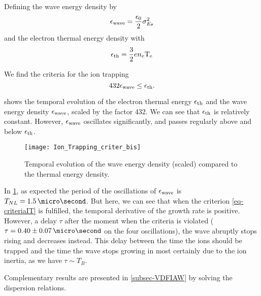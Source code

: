     Defining the wave energy  density by
    \begin{equation} \label{eq-waveE}
      \epsilon_{\rm wave} = \frac{\epsilon_0}{2} \sigma_{E_{\theta}}^2
    \end{equation}
    and the electron thermal energy density with
    \begin{equation} \label{eq-thE}
      \epsilon_{\rm th} = \frac{3}{2} e n_e \mathrm{T_e}
    \end{equation}
    
    We find the criteria for the ion trapping
    \begin{equation} \label{eq-criteriaIT}
      432 \epsilon_{\rm wave} \leq \epsilon_{\rm th}.
    \end{equation}
    
     shows the temporal evolution of the electron thermal energy $\epsilon_{\rm th}$ and the wave energy density $\epsilon_{\rm wave}$, scaled by the factor 432.
    We can see that $\epsilon_{\rm th}$ is relatively constant.
    However, $\epsilon_{\rm wave}$  oscillates significantly, and passes regularly above and below $\epsilon_{\rm th}$.
    
    \begin{figure}[hbt]
      \centering
      \texttt{[image: Ion\_Trapping\_criter\_bis]}
      \caption{Temporal evolution of the wave energy density (scaled) compared to the thermal energy density.}
      \label{fig-tempITcrit}
    \end{figure}
    
    In \cref{fig-tempITcrit}, as expected the period of the oscillations of $\epsilon_{\rm wave}$ is $T_{NL} = 1.5\,\micro\second$.
    But here, we can see that when the criterion \cref{eq-criteriaIT} is fulfilled, the temporal derivative of the growth rate is positive.
    However, a delay $\tau$ after the moment when the criteria is violated ($\tau = 0.40 \pm 0.07 \,\micro\second$ on the four oscillations), the wave abruptly stops rising and decreases instead.
    This delay between the time the ions should be trapped and the time the wave stops growing in most certainly due to the ion inertia, as we have $\tau \sim T_B$.
    
    Complementary results are presented in \cref{subsec-VDFIAW} by solving the dispersion relations.
    
